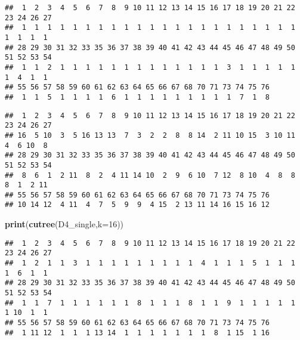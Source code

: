 \documentclass[
]{article}
\newenvironment{Shaded}{\begin{snugshade}}{\end{snugshade}}
\newcommand{\DataTypeTok}[1]{\textcolor[rgb]{0.13,0.29,0.53}{#1}}
\newcommand{\DecValTok}[1]{\textcolor[rgb]{0.00,0.00,0.81}{#1}}
\newcommand{\KeywordTok}[1]{\textcolor[rgb]{0.13,0.29,0.53}{\textbf{#1}}}
\newcommand{\NormalTok}[1]{#1}
\newcommand{\OperatorTok}[1]{\textcolor[rgb]{0.81,0.36,0.00}{\textbf{#1}}}
\begin{document}
\begin{verbatim}
##  1  2  3  4  5  6  7  8  9 10 11 12 13 14 15 16 17 18 19 20 21 22 23 24 26 27 
##  1  1  1  1  1  1  1  1  1  1  1  1  1  1  1  1  1  1  1  1  1  1  1  1  1  1 
## 28 29 30 31 32 33 35 36 37 38 39 40 41 42 43 44 45 46 47 48 49 50 51 52 53 54 
##  1  1  2  1  1  1  1  1  1  1  1  1  1  1  1  1  3  1  1  1  1  1  1  4  1  1 
## 55 56 57 58 59 60 61 62 63 64 65 66 67 68 70 71 73 74 75 76 
##  1  1  5  1  1  1  1  6  1  1  1  1  1  1  1  1  1  7  1  8
\end{verbatim}

\begin{Shaded}
\end{Shaded}

\begin{verbatim}
##  1  2  3  4  5  6  7  8  9 10 11 12 13 14 15 16 17 18 19 20 21 22 23 24 26 27 
## 16  5 10  3  5 16 13 13  7  3  2  2  8  8 14  2 11 10 15  3 10 11  4  6 10  8 
## 28 29 30 31 32 33 35 36 37 38 39 40 41 42 43 44 45 46 47 48 49 50 51 52 53 54 
##  8  6  1  2 11  8  2  4 11 14 10  2  9  6 10  7 12  8 10  4  8  8  8  1  2 11 
## 55 56 57 58 59 60 61 62 63 64 65 66 67 68 70 71 73 74 75 76 
## 10 14 12  4 11  4  7  5  9  9  4 15  2 13 11 14 16 15 16 12
\end{verbatim}

\begin{Shaded}
\begin{Highlighting}[]
\KeywordTok{print}\NormalTok{(}\KeywordTok{cutree}\NormalTok{(D4_single,}\DataTypeTok{k=}\DecValTok{16}\NormalTok{))}
\end{Highlighting}
\end{Shaded}

\begin{verbatim}
##  1  2  3  4  5  6  7  8  9 10 11 12 13 14 15 16 17 18 19 20 21 22 23 24 26 27 
##  1  2  1  1  3  1  1  1  1  1  1  1  1  1  4  1  1  1  5  1  1  1  1  6  1  1 
## 28 29 30 31 32 33 35 36 37 38 39 40 41 42 43 44 45 46 47 48 49 50 51 52 53 54 
##  1  1  7  1  1  1  1  1  1  8  1  1  1  8  1  1  9  1  1  1  1  1  1 10  1  1 
## 55 56 57 58 59 60 61 62 63 64 65 66 67 68 70 71 73 74 75 76 
##  1 11 12  1  1  1 13 14  1  1  1  1  1  1  1  8  1 15  1 16
\end{verbatim}
\end{document}
